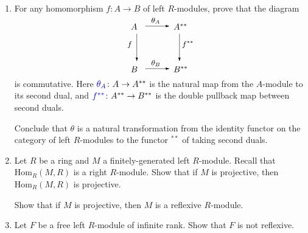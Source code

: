 \documentclass[12pt]{article}
\newcommand{\Hom}{\mbox{Hom}}
\def\defcolor#1{{\color{blue}#1}}
\begin{document}
\begin{enumerate}

 \item  For any homomorphism $f\colon A\to B$ of left $R$-modules, prove that the diagram
   \[
    \begin{picture}(80,62)(-5,0)
        \put(  0,50){$A$} \put( 17,54){\vector(1,0){28}}\put(24,58){\small$\theta_A$}  
        \put( 50,50){$A^{**}$} 
 
        \put(  7,45){\vector(0,-1){32}}  \put( -4,30){\small$f$}
        \put( 57,45){\vector(0,-1){32}}  \put( 60,30){\small$f^{**}$}

        \put(  0,0){$B$} \put( 17,4){\vector(1,0){28}} \put(24, 8){\small$\theta_B$}   
        \put( 50,0){$B^{**}$} 
        \end{picture}
 \]
 is commutative.
 Here $\defcolor{\theta_A}\colon A \to A^{**}$ is the natural map from the $A$-module to its second dual, and\newline
 $\defcolor{f^{**}}\colon A^{**}\to B^{**}$ is the double pullback map between second duals.

 Conclude that $\theta$ is a natural transformation from the identity functor on the category of left $R$-modules to the functor $^{**}$ of
 taking second duals.
   \vspace{-2pt}



\item  Let $R$ be a ring and $M$ a finitely-generated left $R$-module.
  Recall that $\Hom_R(M,R)$ is a right $R$-module.\newline
  Show that if $M$ is projective, then $\Hom_R(M,R)$ is projective.

  Show that  if $M$ is projective, then $M$ is a reflexive $R$-module.
   \vspace{-2pt}


 \item
   Let $F$ be a free left $R$-module of infinite rank.
   Show that $F$ is not reflexive.
   \vspace{-2pt}

\end{enumerate}
\end{document}
